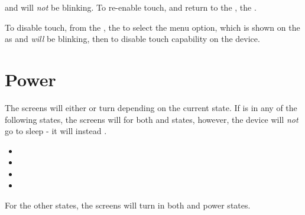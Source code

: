 and will \textit{not} be blinking.  To re-enable touch, and return to the
,  the .


To disable touch, from the \hyperref[Touch - Menu]{},  the
 to select the  menu option, which
is shown on the  as  and \textit{will} be blinking, then
 to disable touch capability on the device.


\pagebreak
\section{Power}

The screens will either  or turn  depending on the current
state.  If  is in any of the following states, the screens will
 for both  and  states, however, the device will
\textit{not} go to sleep - it will instead .

\begin{itemize}
  \item {}
  \item {}
  \item {}
  \item {}
\end{itemize}

For the other  states, the screens will turn  in both 
and  power states.

